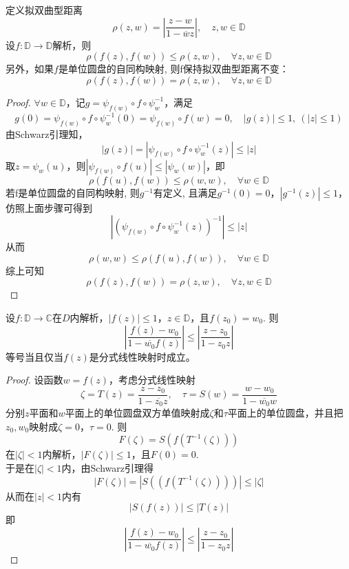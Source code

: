 \begin{theorem}[拟双曲型距离]

    定义拟双曲型距离
    $$\rho(z, w) = \left| \dfrac{z - w}{1 - \overline{w}z} \right|, \quad z, w \in \mathbb{D}$$
    设$f: \mathbb{D} \to \mathbb{D}$解析，则
    $$\rho(f(z), f(w)) \leq \rho(z, w), \quad \forall z, w \in \mathbb{D}$$
    另外，如果$f$是单位圆盘的自同构映射, 则f保持拟双曲型距离不变：
    $$\rho(f(z), f(w)) = \rho(z, w), \quad \forall z, w \in \mathbb{D}$$
    
\end{theorem}

\begin{proof}

    $\forall w \in \mathbb{D}$，记$g = \psi_{f(w)} \circ f \circ \psi^{-1}_{w}$，满足
    $$g(0) = \psi_{f(w)} \circ f \circ \psi^{-1}_{w}(0) = \psi_{f(w)} \circ f(w) = 0, \quad |g(z)| \leq 1,\ (|z| \leq 1)$$
    由\textup{Schwarz}引理知，
    $$|g(z)| = |\psi_{f(w)} \circ f \circ \psi^{-1}_{w}(z)| \leq |z|$$
    取$z = \psi_{w}(u)$，则$|\psi_{f(w)} \circ f(u)| \leq |\psi_{w}(w)|$，即
    $$\rho(f(u), f(w)) \leq \rho(w, w), \quad \forall w \in \mathbb{D}$$
    若f是单位圆盘的自同构映射, 则$g^{-1}$有定义, 且满足$g^{-1}(0) = 0$，$|g^{-1}(z)| \leq 1$，仿照上面步骤可得到
    $$|(\psi_{f(w)} \circ f \circ \psi^{-1}_{w}(z))^{-1}| \leq |z|$$
    从而
    $$\rho(w, w) \leq \rho(f(u), f(w)), \quad \forall w \in \mathbb{D}$$
    综上可知
    $$\rho(f(z), f(w)) = \rho(z, w), \quad \forall z, w \in \mathbb{D}$$

\end{proof}

\begin{theorem}

    设$f:\mathbb{D} \to \mathbb{C}$在$D$内解析，$|f(z)| \leq 1$，$z \in \mathbb{D}$，且$f(z_0) = w_0$. 则
    $$ \left| \dfrac{f(z) - w_0}{1 - \overline{w_0}f(z)} \right| \leq \left| \dfrac{z - z_0}{1 - z_0z} \right|$$
    等号当且仅当$f(z)$是分式线性映射时成立。

\end{theorem}

\begin{proof}
    
    设函数$w = f(z)$，考虑分式线性映射
    $$\zeta = T(z) = \dfrac{z - z_0}{1 - \overline{z_0}z}, \quad \tau = S(w) = \dfrac{w - w_0}{1 - \overline{w_0}w}$$
    分别$z$平面和$w$平面上的单位圆盘双方单值映射成$\zeta$和$\tau$平面上的单位圆盘，并且把$z_0, w_0$映射成$\zeta = 0$，$\tau = 0$. 则
    $$F(\zeta) = S(f(T^{-1}(\zeta)))$$
    在$|\zeta| < 1$内解析，$|F(\zeta)| \leq 1$，且$F(0) = 0$. \\
    于是在$|\zeta| < 1$内，由\textup{Schwarz}引理得
    $$|F(\zeta)| = |S((f(T^{-1}(\zeta))))| \leq |\zeta|$$
    从而在$|z| < 1$内有
    $$|S(f(z))| \leq |T(z)|$$
    即
    $$ \left| \dfrac{f(z) - w_0}{1 - \overline{w_0}f(z)} \right| \leq \left| \dfrac{z - z_0}{1 - z_0z} \right|$$

\end{proof}


